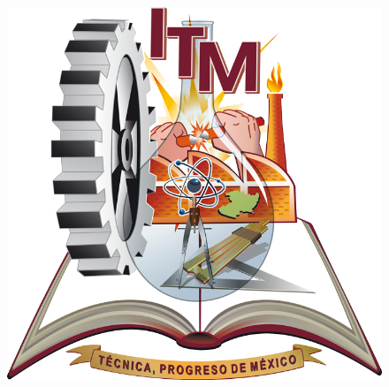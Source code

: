\documentclass[12pt,a4paper]{report}
\begin{document}
\begin{titlepage}
		\begin{center}
			\vspace*{-1in}
			\begin{figure}[htb]
			\centering
					\includegraphics[scale=0.2]{logo_original}
			\end{figure}
			

\end{center}
\end{titlepage}
\end{document}
